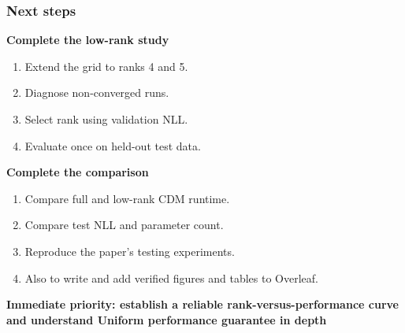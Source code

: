 \documentclass[white,aspect-ratio=16:9]{uom_ltx_talk_casson}
\newcommand{\sectionemphasis}[1]{\textcolor{IITMBlue}{\textbf{#1}}}
\newcommand{\result}[1]{\textcolor{ResultGreen}{\textbf{#1}}}
\begin{document}
\begin{frame}
  \frametitle{Next steps}
  \normalsize
  \begin{minipage}[t]{0.45\textwidth}
    \vspace{0pt}
    \sectionemphasis{Complete the low-rank study}
    \begin{enumerate}
      \item Extend the grid to ranks 4 and 5.
      \item Diagnose non-converged runs.
      \item Select rank using validation NLL.
      \item Evaluate once on held-out test data.
    \end{enumerate}
  \end{minipage}
  \hfill
  \begin{minipage}[t]{0.45\textwidth}
    \vspace{0pt}
    \sectionemphasis{Complete the comparison}
    \begin{enumerate}
      \item Compare full and low-rank CDM runtime.
      \item Compare test NLL and parameter count.
      \item Reproduce the paper's testing experiments.
      \item Also to write and  add verified figures and tables to Overleaf.
    \end{enumerate}
  \end{minipage}

  \vfill
  \centering
  {\small\result{Immediate priority: establish a reliable rank-versus-performance curve and understand Uniform performance guarantee in depth}}
\end{frame}
\end{document}
